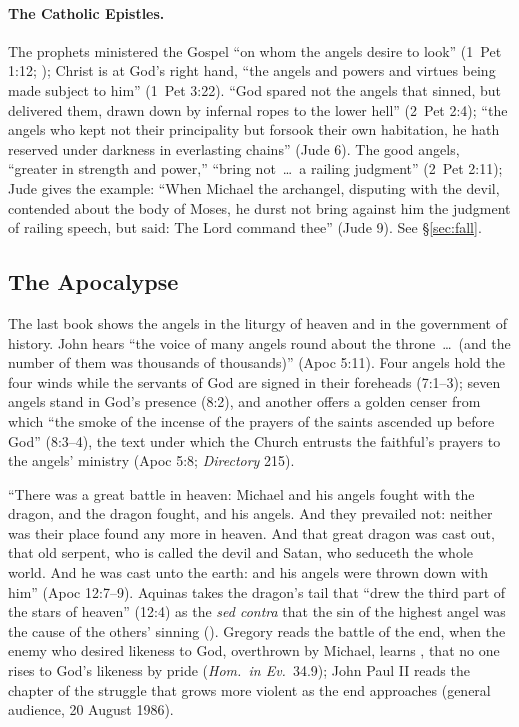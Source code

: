 \paragraph{The Catholic Epistles.} The prophets ministered the Gospel
``on whom the angels desire to look'' (1~Pet 1:12; ); Christ is at God's right hand, ``the angels and powers and virtues
being made subject to him'' (1~Pet 3:22). ``God spared not the angels that sinned, but delivered them, drawn down
by infernal ropes to the lower hell'' (2~Pet 2:4); ``the angels who kept
not their principality but forsook their own habitation, he hath reserved
under darkness in everlasting chains'' (Jude 6). The good angels,
``greater in strength and power,'' ``bring not~\dots\ a railing judgment''
(2~Pet 2:11); Jude gives the example: ``When Michael the archangel,
disputing with the devil, contended about the body of Moses, he durst not
bring against him the judgment of railing speech, but said: The Lord
command thee'' (Jude 9). See \S\ref{sec:fall}.

\subsection{The Apocalypse}

The last book shows the angels in the liturgy of heaven and in the
government of history. John hears ``the voice of many angels round about the throne~\dots\ (and
the number of them was thousands of thousands)'' (Apoc 5:11). Four angels
hold the four winds while the servants of God are signed in their
foreheads (7:1--3); seven angels stand in God's presence (8:2), and
another offers a golden censer from which ``the smoke of the incense of
the prayers of the saints ascended up before God'' (8:3--4), the text
under which the Church entrusts the faithful's prayers to the angels'
ministry (Apoc 5:8; \emph{Directory} 215).

``There was a great battle in heaven: Michael and his angels fought with the
dragon, and the dragon fought, and his angels. And they prevailed not:
neither was their place found any more in heaven. And that great dragon was
cast out, that old serpent, who is called the devil and Satan, who
seduceth the whole world. And he was cast unto the earth: and his angels
were thrown down with him'' (Apoc 12:7--9). Aquinas takes the dragon's tail
that ``drew the third part of the stars of heaven'' (12:4) as the
\emph{sed contra} that the sin of the highest angel was the cause of the
others' sinning (). Gregory reads the battle of the end, when the enemy who desired likeness
to God, overthrown by Michael, learns , that no one rises to God's likeness by pride
(\emph{Hom.\ in Ev.}\ 34.9); John Paul II reads the
chapter of the struggle that grows more violent as the end approaches
(general audience, 20 August 1986).

